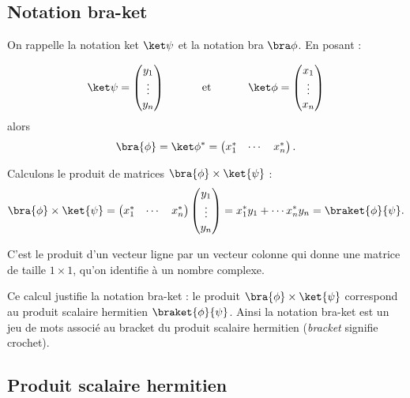 \documentclass[11pt,class=report,crop=false]{standalone}
\begin{document}
\subsection{Notation bra-ket}


On rappelle la notation \og{}ket\fg{} $\ket\psi$
et la notation \og{}bra\fg{} $\bra\phi$. En posant :

$$\ket\psi = \begin{pmatrix}y_1 \\ \vdots \\ y_{n} \end{pmatrix}
\qquad\quad \text{ et } \qquad\quad 
\ket\phi = \begin{pmatrix}x_1 \\ \vdots \\ x_{n} \end{pmatrix}
$$
alors
$$
\bra{\phi} = \ket\phi^* = \begin{pmatrix}x_1^*& \cdots &x_{n}^*\end{pmatrix}.$$



Calculons le produit de matrices $\bra{\phi} \times \ket{\psi}$  : 
$$\bra{\phi} \times \ket{\psi}
= \begin{pmatrix}x_1^*& \cdots &x_{n}^*\end{pmatrix} \begin{pmatrix}y_1 \\ \vdots \\ y_{n} \end{pmatrix} = x_1^*y_1+ \cdots x_n^*y_n = \braket{\phi}{\psi}.$$

C'est le produit d'un vecteur ligne par un vecteur colonne qui donne une matrice de taille $1\times 1$, qu'on identifie à un nombre complexe.

Ce calcul justifie la notation \og{}bra-ket\fg{} : le produit $\bra{\phi} \times \ket{\psi}$
correspond au produit scalaire hermitien $\braket{\phi}{\psi}$.
Ainsi la notation \og{}bra-ket\fg{} est un jeu de mots associé au \og{}bracket\fg{} du produit scalaire hermitien (\emph{bracket} signifie crochet).


\subsection{Produit scalaire hermitien}
\end{document}
